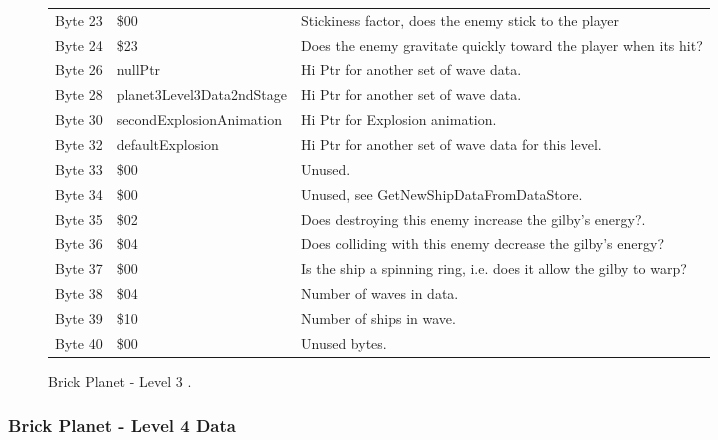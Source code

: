 \begin{figure}[H]
{\begin{adjustbox}{width=12cm}
\begin{tabular}{lll}
 Byte 23 & \$00                       & Stickiness factor, does the enemy stick to the player              \\
 Byte 24 & \$23                       & Does the enemy gravitate quickly toward the player when its hit?   \\
 Byte 26 & nullPtr                   & Hi Ptr for another set of wave data.                               \\
 Byte 28 & planet3Level3Data2ndStage & Hi Ptr for another set of wave data.                               \\
 Byte 30 & secondExplosionAnimation  & Hi Ptr for Explosion animation.                                    \\
 Byte 32 & defaultExplosion          & Hi Ptr for another set of wave data for this level.                \\
 Byte 33 & \$00                       & Unused.                                                            \\
 Byte 34 & \$00                       & Unused, see GetNewShipDataFromDataStore.                           \\
 Byte 35 & \$02                       & Does destroying this enemy increase the gilby's energy?.           \\
 Byte 36 & \$04                       & Does colliding with this enemy decrease the gilby's energy?        \\
 Byte 37 & \$00                       & Is the ship a spinning ring, i.e. does it allow the gilby to warp? \\
 Byte 38 & \$04                       & Number of waves in data.                                           \\
 Byte 39 & \$10                       & Number of ships in wave.                                           \\
 Byte 40 & \$00                       & Unused bytes.                                                      \\
\bottomrule
\end{tabular}

  \end{adjustbox}

  }\caption*{Brick Planet - Level 3
.}
\end{figure}

\clearpage
\subsubsection{Brick Planet - Level 4 Data}

